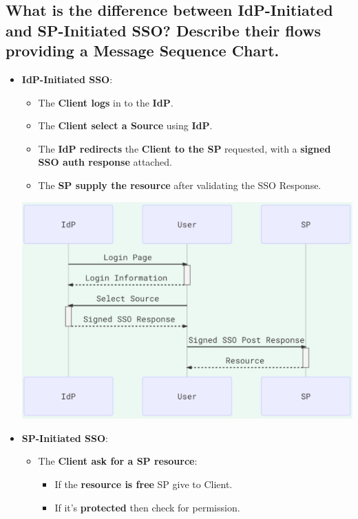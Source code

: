\documentclass[9pt, letterpaper]{article}
\begin{document}
\subsection{What is the difference between IdP-Initiated and SP-Initiated SSO? Describe their flows providing a Message Sequence Chart.}
\begin{itemize}
	\item \textbf{IdP-Initiated SSO}:
	      \begin{itemize}
		      \item The \textbf{Client logs} in to the \textbf{IdP}.
		      \item The \textbf{Client select a Source} using \textbf{IdP}.
		      \item The \textbf{IdP redirects} the \textbf{Client to the SP} requested, with a \textbf{signed SSO auth response} attached.
		      \item The \textbf{SP supply the resource} after validating the SSO Response.
	      \end{itemize}
	      \begin{center}
		      \includegraphics[scale=0.6]{SSO_IDP.png}
	      \end{center}
	      \newpage
	\item \textbf{SP-Initiated SSO}:
	      \begin{itemize}
		      \item The \textbf{Client ask for a SP resource}:
		            \begin{itemize}
			            \item If the \textbf{resource is free} SP give to Client.
			            \item If it's \textbf{protected} then check for permission.

\end{itemize}
\end{itemize}
\end{itemize}
\end{document}
